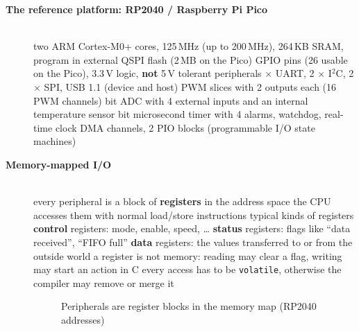 \begin{description}
\item[{\rot\bf The reference platform: RP2040 / Raspberry Pi Pico}]~\\[-\lblskip]
\bi
	\ite two ARM Cortex-M0+ cores, 125\,MHz (up to 200\,MHz), 264\,KB SRAM, program in external QSPI flash (2\,MB on the Pico)
	 GPIO pins (26 usable on the Pico), 3.3\,V logic, \textbf{not} 5\,V tolerant
	\ite peripherals
	\bi
		 $\times$ UART, 2 $\times$ I$^2$C, 2 $\times$ SPI, USB 1.1 (device and host)
		 PWM slices with 2 outputs each (16 PWM channels)
		 bit ADC with 4 external inputs and an internal temperature sensor
		 bit microsecond timer with 4 alarms, watchdog, real-time clock
		 DMA channels, 2 PIO blocks (programmable I/O state machines)
	\ei
\ei
\os{\newpage}

\item[{\rot\bf Memory-mapped I/O}]~\\[-\lblskip]
\bi
	\ite every peripheral is a block of \textbf{registers} in the address space
	\ite the CPU accesses them with normal load/store instructions
	\ite typical kinds of registers
	\bi
		\ite \textbf{control} registers: mode, enable, speed, \ldots
		\ite \textbf{status} registers: flags like ``data received'', ``FIFO full''
		\ite \textbf{data} registers: the values transferred to or from the outside world
	\ei
	\ite a register is not memory: reading may clear a flag, writing may start an action
	\bi
		\ite in C every access has to be \texttt{volatile}, otherwise the compiler may remove or merge it
	\ei
\ei

\begin{figure}[!hbtp]
\begin{center}
\caption{Peripherals are register blocks in the memory map (RP2040 addresses)}
\end{center}
\end{figure}
\os{\newpage}


\end{description}

